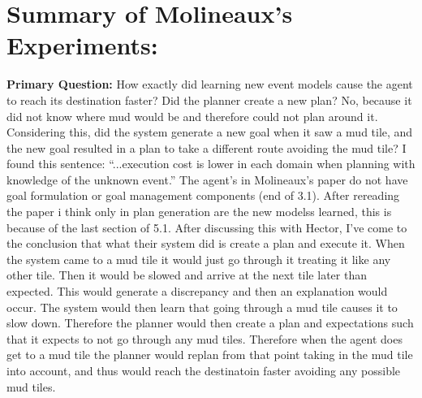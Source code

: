 \documentclass{article}
\begin{document}
\section{Summary of Molineaux's Experiments:}
\textbf{Primary Question:} How exactly did learning new event models cause the agent to reach its destination faster? Did the planner create a new plan? No, because it did not know where mud would be and therefore could not plan around it. Considering this, did the system generate a new goal when it saw a mud tile, and the new goal resulted in a plan to take a different route avoiding the mud tile? I found this sentence: ``...execution cost is lower in each domain when planning with knowledge of the unknown event.'' The agent's in Molineaux's paper do not have goal formulation or goal management components (end of 3.1). After rereading the paper i think only in plan generation are the new modelss learned, this is because of the last section of 5.1. After discussing this with Hector, I've come to the conclusion that what their system did is create a plan and execute it. When the system came to a mud tile it would just go through it treating it like any other tile. Then it would be slowed and arrive at the next tile later than expected. This would generate a discrepancy and then an explanation would occur. The system would then learn that going through a mud tile causes it to slow down. Therefore the planner would then create a plan and expectations such that it expects to not go through any mud tiles. Therefore when the agent does get to a mud tile the planner would replan from that point taking in the mud tile into account, and thus would reach the destinatoin faster avoiding any possible mud tiles.
\end{document}
